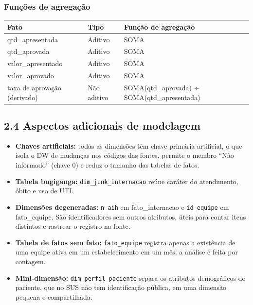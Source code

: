 \documentclass[12pt,a4paper]{article}
\begin{document}
\subsubsection*{Funções de agregação}

\par\noindent\begin{minipage}{\linewidth}\small{}\begin{tabular}{|>{\raggedright\arraybackslash}p{}|>{\raggedright\arraybackslash}p{}|>{\raggedright\arraybackslash}p{}|}\hline\rowcolor{azul}\color{white}\bfseries Fato & \color{white}\bfseries Tipo & \color{white}\bfseries Função de agregação \\ \hline
qtd\_\allowbreak{}apresentada & Aditivo & SOMA \\ \hline
qtd\_\allowbreak{}aprovada & Aditivo & SOMA \\ \hline
valor\_\allowbreak{}apresentado & Aditivo & SOMA \\ \hline
valor\_\allowbreak{}aprovado & Aditivo & SOMA \\ \hline
taxa de aprovação (derivado) & Não aditivo & SOMA(qtd\_\allowbreak{}aprovada) ÷ SOMA(qtd\_\allowbreak{}apresentada) \\ \hline\end{tabular}\end{minipage}\par\medskip

\FloatBarrier\subsection*{2.4 Aspectos adicionais de modelagem}

\begin{itemize}\item \textbf{Chaves artificiais:} todas as dimensões têm chave primária artificial, o que isola o DW de mudanças nos códigos das fontes, permite o membro “Não informado” (chave 0) e reduz o tamanho das tabelas de fatos.
\item \textbf{Tabela bugiganga:} \texttt{dim\_\allowbreak{}junk\_\allowbreak{}internacao} reúne caráter do atendimento, óbito e uso de UTI.
\item \textbf{Dimensões degeneradas:} \texttt{n\_\allowbreak{}aih} em fato\_\allowbreak{}internacao e \texttt{id\_\allowbreak{}equipe} em fato\_\allowbreak{}equipe. São identificadores sem outros atributos, úteis para contar itens distintos e rastrear o registro na fonte.
\item \textbf{Tabela de fatos sem fato:} \texttt{fato\_\allowbreak{}equipe} registra apenas a existência de uma equipe ativa em um estabelecimento em um mês; a análise é feita por contagem.
\item \textbf{Mini-dimensão:} \texttt{dim\_\allowbreak{}perfil\_\allowbreak{}paciente} separa os atributos demográficos do paciente, que no SUS não tem identificação pública, em uma dimensão pequena e compartilhada.\end{itemize}
\end{document}
